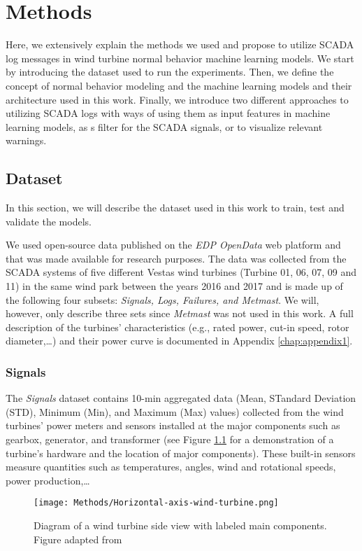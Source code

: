 \chapter{Methods}
\label{chap:methods}
Here, we extensively explain the methods we used and propose to utilize SCADA log messages in wind turbine normal behavior machine learning models.
We start by introducing the dataset used to run the experiments.
Then, we define the concept of normal behavior modeling and the machine learning models and their architecture used in this work.
Finally, we introduce two different approaches to utilizing SCADA logs with ways of using them as input features in machine learning models, as s filter for the SCADA signals,
or to visualize relevant warnings.

\section{Dataset}
In this section, we will describe the dataset used in this work to train, test and validate the models. 
\par We used open-source data published on the \emph{EDP OpenData} web platform \cite{EDP} and that was made available for research purposes. 
The data was collected from the SCADA systems of five different Vestas wind turbines (Turbine 01, 06, 07, 09 and 11) in the same wind park between the years 2016 and 2017 
and is made up of the following four subsets: \emph{Signals, Logs, Failures, and Metmast}. We will, however, only describe three sets since \emph{Metmast} was not used in this work.
A full description of the turbines' characteristics (e.g., rated power, cut-in speed, rotor diameter,\dots) and their power curve is documented in Appendix \ref{chap:appendix1}.

\subsection{Signals}
 The \emph{Signals} dataset contains 10-min aggregated data (Mean, STandard Deviation (STD), Minimum (Min), and Maximum (Max) values) collected from the wind turbines' power meters and
 sensors installed at the major components such as gearbox, generator, and transformer (see Figure \ref{fig:WTG_Diagram} for a 
 demonstration of a turbine's hardware and the location of major components). These built-in sensors measure quantities such as temperatures, angles, wind and rotational speeds, 
 power production,\dots

 \begin{figure}[H]
  \begin{center}
    \texttt{[image: Methods/Horizontal-axis-wind-turbine.png]}
  \end{center}
  \caption{Diagram of a wind turbine side view with labeled main components. Figure adapted from \cite{WTG_Diagram}}
  \label{fig:WTG_Diagram}
\end{figure}

